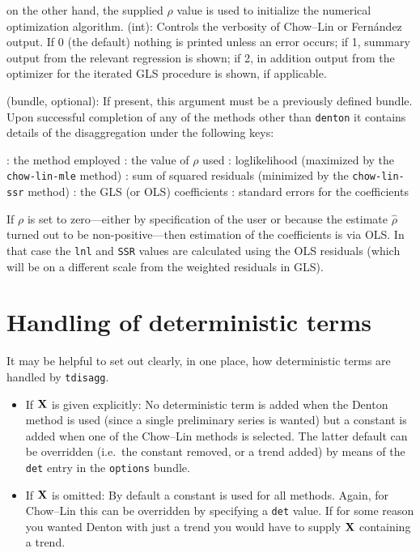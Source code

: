 \begin{description}
\begin{description}
    on the other hand, the supplied $\rho$ value is used to initialize
    the numerical optimization algorithm.
  \tditem[verbose](int): Controls the verbosity of Chow--Lin or
    Fern\'andez output. If 0 (the default) nothing is printed unless
    an error occurs; if 1, summary output from the relevant regression
    is shown; if 2, in addition output from the optimizer for the
    iterated GLS procedure is shown, if applicable.
  \end{description}
\tditem[results](bundle, optional): If present, this argument
  must be a previously defined bundle. Upon successful completion of
  any of the methods other than \texttt{denton} it contains details of
  the disaggregation under the following keys:
  \begin{description}
  \tditem[method]: the method employed
  \tditem[rho]: the value of $\rho$ used
  \tditem[lnl]: loglikelihood (maximized by the
    \texttt{chow-lin-mle} method)
  \tditem[SSR]: sum of squared residuals (minimized by the
    \texttt{chow-lin-ssr} method)
  \tditem[coeff]: the GLS (or OLS) coefficients
  \tditem[stderr]: standard errors for the coefficients
  \end{description}
  If $\rho$ is set to zero---either by specification of the user or
  because the estimate $\hat{\rho}$ turned out to be
  non-positive---then estimation of the coefficients is via OLS. In
  that case the \texttt{lnl} and \texttt{SSR} values are calculated
  using the OLS residuals (which will be on a different scale from the
  weighted residuals in GLS).
\end{description}

\section{Handling of deterministic terms}
\label{sec:tdisagg-det}

It may be helpful to set out clearly, in one place, how deterministic
terms are handled by \texttt{tdisagg}.
\begin{itemize}
\item If $\mathbf{X}$ is given explicitly: No deterministic term is added
  when the Denton method is used (since a single preliminary series is
  wanted) but a constant is added when one of the Chow--Lin methods is
  selected. The latter default can be overridden (i.e.\ the constant
  removed, or a trend added) by means of the \texttt{det} entry in the
  \texttt{options} bundle.
\item If $\mathbf{X}$ is omitted: By default a constant is used for all
  methods. Again, for Chow--Lin this can be overridden by specifying a
  \texttt{det} value. If for some reason you wanted Denton with just a
  trend you would have to supply $\mathbf{X}$ containing a trend.
\end{itemize}

